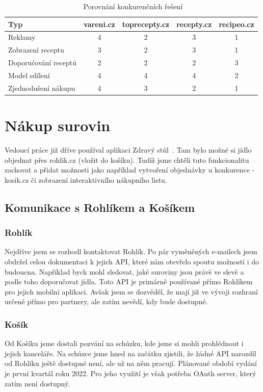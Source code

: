 \begin{table}[H]\centering
    \caption{~Porovnání konkurenčních řešení}\label{tab:recipeo:konkurencni-reseni}
    \begin{tabular}{l|c|c|c|c}
        Typ		                & vareni.cz & toprecepty.cz & recepty.cz & recipeo.cz \tabularnewline \hline
        Reklamy		            & 4		    & 2	            & 3          & 1          \tabularnewline \hline
        Zobrazení receptu	    & 3		    & 2	            & 3          & 1          \tabularnewline \hline
        Doporučování receptů	& 2		    & 2	            & 2          & 3          \tabularnewline \hline
        Model sdílení	        & 4		    & 4	            & 4          & 2          \tabularnewline \hline
        Zjednodušení nákupu	    & 4		    & 3	            & 2          & 1          \tabularnewline
    \end{tabular}
\end{table}

\section{Nákup surovin}

Vedoucí práce již dříve používal aplikaci Zdravý stůl~\cite{ZdravyStul}. Tam bylo možné si jídlo objednat přes rohlik.cz (vložit do košíku).
Tudíž jsme chtěli tuto funkcionalitu zachovat a přidat možnosti jako například vytvoření objednávky u konkurence - kosik.cz
či zobrazení interaktivního nákupního listu.

\subsection{Komunikace s Rohlíkem a Košíkem}

\subsubsection{Rohlík}
Nejdříve jsem se rozhodl kontaktovat Rohlík. Po pár vyměněných e-mailech jsem obdržel celou dokumentaci k jejich API,
které nám otevřelo spoutu možností i do budoucna. Například bych mohl sledovat, jaké suroviny jsou právě ve slevě a
podle toho doporučovat jídla. Toto API je primárně používané přímo Rohlíkem pro jejich mobilní aplikaci. Avšak jsem se
dozvěděl, že mají již ve vývoji rozhraní určené přímo pro partnery, ale zatím nevědí, kdy bude dostupné.

\subsubsection{Košík}
Od Košíku jsme dostali pozvání na schůzku, kde jsme si mohli prohlédnout i jejich kanceláře. Na schůzce jsme hned na začátku
zjistili, že žádné API narozdíl od Rohlíku ještě dostupné není, ale už na něm pracují. Plánované období vydání je
první kvartál roku 2022. Pro jeho využití je však potřeba OAuth server, který zatím není dostupný.

